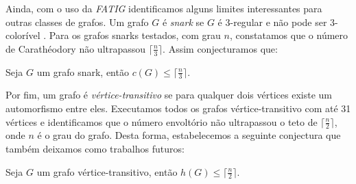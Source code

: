 %

Ainda, com o uso da {\it FATIG} identificamos alguns limites interessantes para outras classes de grafos.
Um grafo $G$ é \textit{snark} se $G$ é 3-regular e não pode ser 3-colorível \cite{Brinkmann2013,hog2013}.
Para os grafos snarks testados, com grau $n$, constatamos que o número de Carathéodory não ultrapassou $\lceil\frac{n}{3}\rceil$. Assim conjecturamos que:

\begin{conjecture}
    Seja $G$ um grafo snark, então $c(G) \le \lceil\frac{n}{3}\rceil$.
    \label{conjecture-snark}
\end{conjecture}


Por fim, um grafo é \textit{vértice-transitivo} se para qualquer dois vértices existe um automorfismo entre eles.
Executamos todos os grafos vértice-transitivo com até 31 vértices 
e identificamos que o número envoltório não ultrapassou o teto de $\lceil\frac{n}{2}\rceil$, onde $n$ é o grau do grafo. 
Desta forma, estabelecemos a seguinte conjectura que também deixamos como trabalhos futuros:

\begin{conjecture}
Seja $G$ um grafo vértice-transitivo, então $h(G) \le \lceil\frac{n}{2}\rceil$.
\label{conjecture-vt}
\end{conjecture}